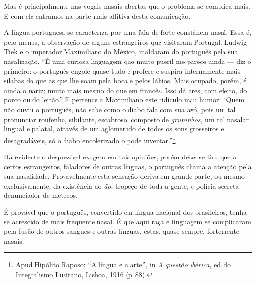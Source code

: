 Mas é principalmente nas vogais nasais abertas que o problema se
complica mais. E com ele entramos na parte mais aflitiva desta
comunicação.

A língua portuguesa se caracteriza por uma fala de forte constância
nasal. Essa é, pelo menos, a observação de alguns estrangeiros que
visitaram Portugal. Ludwig Tiek e o imperador Maximiliano do México,
maldaram do português pela sua nasalização. ``É uma curiosa linguagem
que muito pueril me parece ainda --- diz o primeiro: o português engole
quase tudo e profere e suspira internamente mais sílabas do que as que
lhe soam pela boca e pelos lábios. Mais ocupado, porém, é ainda o nariz;
muito mais mesmo do que em francês. Isso dá ares, com efeito, do porco
ou do leitão.'' E pertence a Maximiliano este ridículo mau humor: ``Quem
não ouviu o português, não sabe como o diabo fala com sua avó, pois um
tal pronunciar roufenho, sibilante, escabroso, composto de \textit{gruninhos}, um
tal nasalar lingual e palatal, através de um aglomerado de todos os sons
grosseiros e desagradáveis, só o diabo encolerizado o pode inventar.''\footnote{Apud Hipólito Raposo: ``A língua e a arte'', in \textit{A questão ibérica},
ed.\,do Integralismo Lusitano, Lisboa, 1916 (p.\,88).}

Há evidente o desprezível exagero em tais opiniões, porém delas se tira
que a certos estrangeiros, faladores de outras línguas, o português
chama a atenção pela sua nasalidade. Provavelmente esta sensação deriva
em grande parte, ou mesmo exclusivamente, da existência do \textit{ão}, tropeço
de toda a gente, e polícia secreta denunciador de metecos.

É provável que o português, convertido em língua nacional dos
brasileiros, tenha se acrescido de mais frequente nasal. É que aqui raça
e linguagem se complicaram pela fusão de outros sangues e outras
línguas, estas, quase sempre, fortemente nasais.

